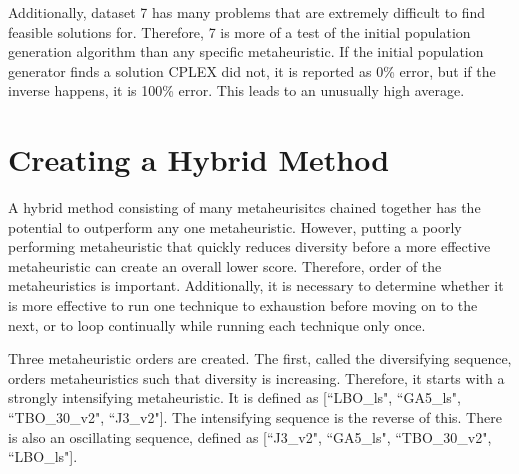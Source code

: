 \documentclass[11pt, letterpaper, onecolumn]{article}
\begin{document}
Additionally, dataset 7 has many problems that are extremely difficult to find feasible solutions for. Therefore, 7 is more of a test of the initial population generation algorithm than any specific metaheuristic. If the initial population generator finds a solution CPLEX did not, it is reported as 0\% error, but if the inverse happens, it is 100\% error. This leads to an unusually high average. 



\begin{table}[htbp]
\end{table}

\begin{table}[htbp]
\end{table}



\section{Creating a Hybrid Method}

A hybrid method consisting of many metaheurisitcs chained together has the potential to outperform any one metaheuristic. However, putting a poorly performing metaheuristic that quickly reduces diversity before a more effective metaheuristic can create an overall lower score. Therefore, order of the metaheuristics is important. Additionally, it is necessary to determine whether it is more effective to run one technique to exhaustion before moving on to the next, or to loop continually while running each technique only once. 

Three metaheuristic orders are created. The first, called the diversifying sequence, orders metaheuristics such that diversity is increasing. Therefore, it starts with a strongly intensifying metaheuristic. It is defined as [``LBO\_ls", ``GA5\_ls", ``TBO\_30\_v2", ``J3\_v2"]. The intensifying sequence is the reverse of this. There is also an oscillating sequence, defined as [``J3\_v2", ``GA5\_ls", ``TBO\_30\_v2", ``LBO\_ls"]. 
\end{document}
